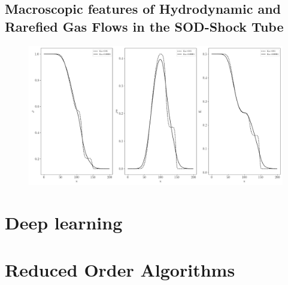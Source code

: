 \documentclass[12pt, a4paper]{article}
\begin{document}
\subsection{Macroscopic features of Hydrodynamic and Rarefied Gas Flows in the SOD-Shock Tube} \label{FeaturesSOD}
\begin{figure}[!htbp]
	\includegraphics[width=\textwidth]{Figures/Macroscopic_Quantities_Original.png}
\end{figure}
\section{Deep learning}
\section{Reduced Order Algorithms}
\end{document}
